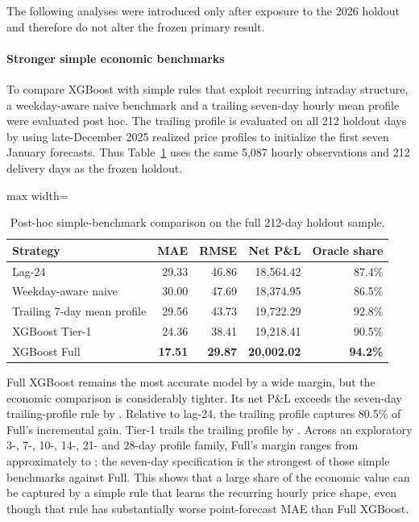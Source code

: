 The following analyses were introduced only after exposure to the 2026 holdout and therefore do not alter the frozen primary result.

\paragraph{Stronger simple economic benchmarks}
To compare XGBoost with simple rules that exploit recurring intraday structure, a weekday-aware naive benchmark and a trailing seven-day hourly mean profile were evaluated post hoc. The trailing profile is evaluated on all 212 holdout days by using late-December 2025 realized price profiles to initialize the first seven January forecasts. Thus Table~\ref{tab:posthoc_benchmarks} uses the same 5,087 hourly observations and 212 delivery days as the frozen holdout.

\begin{table}[htbp]
\centering
\caption{Post-hoc simple-benchmark comparison on the full 212-day holdout sample.}
\label{tab:posthoc_benchmarks}
\begin{adjustbox}{max width=\textwidth}
\begin{tabular}{lrrrr}
\toprule
Strategy & MAE & RMSE & Net P\&L & Oracle share \\
\midrule
Lag-24 & 29.33 & 46.86 & 18,564.42 & 87.4\% \\
Weekday-aware naive & 30.00 & 47.69 & 18,374.95 & 86.5\% \\
Trailing 7-day mean profile & 29.56 & 43.73 & 19,722.29 & 92.8\% \\
XGBoost Tier-1 & 24.36 & 38.41 & 19,218.41 & 90.5\% \\
XGBoost Full & \textbf{17.51} & \textbf{29.87} & \textbf{20,002.02} & \textbf{94.2\%} \\
\bottomrule
\end{tabular}
\end{adjustbox}
\end{table}

Full XGBoost remains the most accurate model by a wide margin, but the economic comparison is considerably tighter. Its net P\&L exceeds the seven-day trailing-profile rule by . Relative to lag-24, the trailing profile captures 80.5\% of Full's  incremental gain. Tier-1 trails the trailing profile by . Across an exploratory 3-, 7-, 10-, 14-, 21- and 28-day profile family, Full's margin ranges from approximately  to ; the seven-day specification is the strongest of those simple benchmarks against Full. This shows that a large share of the economic value can be captured by a simple rule that learns the recurring hourly price shape, even though that rule has substantially worse point-forecast MAE than Full XGBoost.

